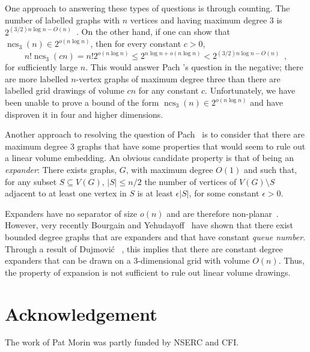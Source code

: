 \documentclass{patmorin}
\DeclareMathOperator{\ncs}{ncs}
\begin{document}
One approach to answering these types of questions is
through counting.  The number of labelled graphs with $n$
vertices and having maximum degree $3$ is $2^{(3/2)n\log n -
O(n)}$~\cite[Appendix~A]{barat.matousek.ea:bounded-degree}. On the other
hand, if one can show that $\ncs_3(n)\in 2^{o(n\log n)}$, then for every
constant $c>0$,
\[
   n!\ncs_3(cn) = n!2^{o(n\log n)} \le 2^{n\log n + o(n\log n)}
   < 2^{(3/2)n\log n - O(n)} \enspace ,
\]
for sufficiently large $n$. This would answer Pach \etal's question
in the negative; there are more labelled $n$-vertex graphs of maximum
degree three than there are labelled grid drawings of volume $cn$ for
any constant $c$.  Unfortunately, we have been unable to prove a bound
of the form $\ncs_3(n)\in 2^{o(n\log n)}$ and have disproven it in four
and higher dimensions.

Another approach to resolving the question of Pach \etal\ is to consider
that there are maximum degree 3 graphs that have some properties that
would seem to rule out a linear volume embedding.  An obvious candidate
property is that of being an \emph{expander}: There exists graphs, $G$,
with maximum degree $O(1)$ and such that, for any subset $S\subseteq
V(G)$, $|S|\le n/2$ the number of vertices of $V(G)\setminus S$ adjacent
to at least one vertex in $S$ is at least $\epsilon|S|$, for some constant
$\epsilon > 0$.

Expanders have no separator of size $o(n)$ and are therefore
non-planar~\cite{lipton.tarjan:separator}.  However, very recently
Bourgain and Yehudayoff~\cite{bourgain.yehudayoff:monotone} have shown
that there exist bounded degree graphs that are expanders and that
have constant \emph{queue number}.  Through a result of Dujmovi\'c
\etal~\cite[Theorem~8]{dujmovic.por.ea:track}, this implies that there
are constant degree expanders that can be drawn on a 3-dimensional grid
with volume $O(n)$. Thus, the property of expansion is not sufficient
to rule out linear volume drawings.


\section*{Acknowledgement}

The work of Pat Morin was partly funded by NSERC and CFI.



\end{document}
